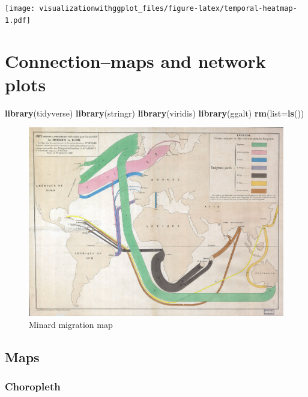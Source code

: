 \documentclass[]{krantz}
\makeatletter
\newenvironment{Shaded}{\begin{snugshade}}{\end{snugshade}}
\newcommand{\DataTypeTok}[1]{\textcolor[rgb]{0.13,0.29,0.53}{#1}}
\newcommand{\KeywordTok}[1]{\textcolor[rgb]{0.13,0.29,0.53}{\textbf{#1}}}
\newcommand{\NormalTok}[1]{#1}
\newenvironment{kframe}{%
\medskip{}
\setlength{\fboxsep}{.8em}
 \def\at@end@of@kframe{}%
 \ifinner\ifhmode%
  \def\at@end@of@kframe{\end{minipage}}%
  \begin{minipage}{\columnwidth}%
 \fi\fi%
 \def\FrameCommand##1{\hskip\@totalleftmargin \hskip-\fboxsep
 \colorbox{shadecolor}{##1}\hskip-\fboxsep
     \hskip-\linewidth \hskip-\@totalleftmargin \hskip\columnwidth}%
 \MakeFramed {\advance\hsize-\width
   \@totalleftmargin\z@ \linewidth\hsize
   \@setminipage}}%
 {\par\unskip\endMakeFramed%
 \at@end@of@kframe}
\renewenvironment{Shaded}{\begin{kframe}}{\end{kframe}}
\makeatother
\begin{document}
\texttt{[image: visualizationwithggplot\_files/figure-latex/temporal-heatmap-1.pdf]}

\cleardoublepage

\hypertarget{Connection}{%
\chapter{Connection--maps and network plots}\label{Connection}}

\begin{Shaded}
\begin{Highlighting}[]
\KeywordTok{library}\NormalTok{(tidyverse)}
\KeywordTok{library}\NormalTok{(stringr)}
\KeywordTok{library}\NormalTok{(viridis)}
\KeywordTok{library}\NormalTok{(ggalt)}
\KeywordTok{rm}\NormalTok{(}\DataTypeTok{list=}\KeywordTok{ls}\NormalTok{())}
\end{Highlighting}
\end{Shaded}

\begin{figure}
\centering
\includegraphics{images/Minard_migration.jpg}
\caption{Minard migration map}
\end{figure}

\hypertarget{maps}{%
\section{Maps}\label{maps}}

\hypertarget{choropleth}{%
\subsection{Choropleth}\label{choropleth}}
\end{document}
